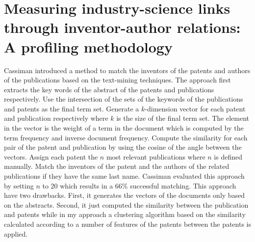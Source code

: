 \section{Measuring industry-science links through inventor-author relations: A profiling methodology}
Cassiman introduced a method to match the inventors of the patents and authors of the publications based on the text-mining techniques\cite{MISLT}.  The approach first extracts the key words of the abstract of the patents and publications respectively. Use the intersection of the sets of the keywords of the publications and patents as the final term set. Generate a $k$-dimension vector for each patent and publication respectively where $k$ is the size of the final term set. The element in the vector is the weight of a term in the document which is computed by the term frequency and inverse document frequency. Compute the similarity for each pair of the patent and publication by using the cosine of the angle between the vectors. Assign each patent the $n$ most relevant publications where $n$ is defined manually. Match the inventors of the patent and the authors of the related publications if they have the same last name. Cassiman evaluated this approach by setting $n$ to 20 which results in a 66\% successful matching. This approach have two drawbacks. First, it generates the vectors of the documents only based on the abstracts. Second, it just computed the similarity between the publication and patents while in my approach a clustering algorithm based on the similarity calculated according to a number of features of the patents between the patents is applied.  


